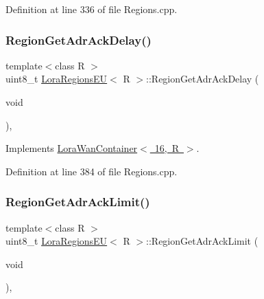 Definition at line 336 of file Regions.\+cpp.

\mbox{\label{class_lora_regions_e_u_a4e27410febd49bfc58d3bf986177c1e7}} 
\subsubsection{\texorpdfstring{Region\+Get\+Adr\+Ack\+Delay()}{RegionGetAdrAckDelay()}}
{\footnotesize\ttfamily template$<$class R $>$ \\
uint8\+\_\+t \mbox{\hyperlink{class_lora_regions_e_u}{Lora\+Regions\+EU}}$<$ R $>$\+::Region\+Get\+Adr\+Ack\+Delay (\begin{DoxyParamCaption}\item[{void}]{ }\end{DoxyParamCaption})\hspace{0.3cm}{\ttfamily [protected]}, {\ttfamily [virtual]}}



Implements \mbox{\hyperlink{class_lora_wan_container_ad90b5c47b794730a1027a548f20fd63c}{Lora\+Wan\+Container$<$ 16, R $>$}}.



Definition at line 384 of file Regions.\+cpp.

\mbox{\label{class_lora_regions_e_u_aed553b79468100fb271bb2ac6a230c58}} 
\subsubsection{\texorpdfstring{Region\+Get\+Adr\+Ack\+Limit()}{RegionGetAdrAckLimit()}}
{\footnotesize\ttfamily template$<$class R $>$ \\
uint8\+\_\+t \mbox{\hyperlink{class_lora_regions_e_u}{Lora\+Regions\+EU}}$<$ R $>$\+::Region\+Get\+Adr\+Ack\+Limit (\begin{DoxyParamCaption}\item[{void}]{ }\end{DoxyParamCaption})\hspace{0.3cm}{\ttfamily [protected]}, {\ttfamily [virtual]}}




